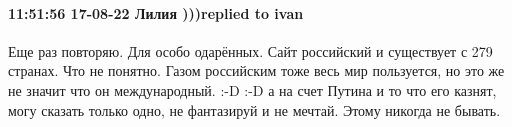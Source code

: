  
 
 
 
 

\paragraph{11:51:56 17-08-22 Лилия )))replied to ivan}

Еще раз повторяю. Для особо одарённых. Сайт российский и существует с 279
странах. Что не понятно. Газом российским тоже весь мир пользуется, но это же
не значит что он международный. :-D :-D а на счет Путина и то что его казнят,
могу сказать только одно, не фантазируй и не мечтай. Этому никогда не бывать.
